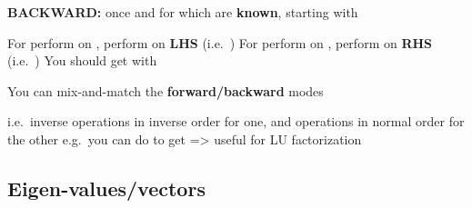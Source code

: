 \hSep %

\textbf{BACKWARD:} once  and
 for which  are
\textbf{known}, starting with \iMbox{[I_{m} \ | \ A \ | \ I_{n}]}

\begin{itemize}

      \vItem
            For  perform  on
            , perform  on \textbf{LHS}
            (i.e.~)
      \vItem
            For  perform  on ,
            perform  on \textbf{RHS}
            (i.e.~)
      \vItem
            You should get
            \iMbox{\ds [I_{m} \ | \ A \ | \ I_{n}] \rightsquigarrow [R^{-1} \ | \ A' \ | \ C^{-1}]}
            with 
\end{itemize}

\hSep %

You can mix-and-match the \textbf{forward/backward} modes

\begin{itemize}

      \vItem
            i.e.~inverse operations in inverse order for one, and operations in
            normal order for the other
      \vItem
            e.g.~you can do
            \iMbox{\ds [I_{m} \ | \ A \ | \ I_{n}] \rightsquigarrow [R^{-1} \ | \ A' \ | \ C]}
            to get  => useful for LU
            factorization
\end{itemize}


\subsection*{Eigen-values/vectors}

